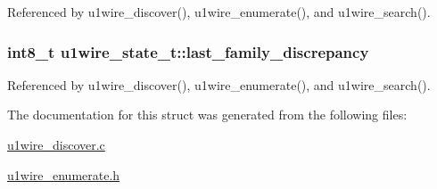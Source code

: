 Referenced by u1wire\_\-discover(), u1wire\_\-enumerate(), and u1wire\_\-search().\hypertarget{structu1wire__state__t_081ea182a1de94cbc5ed7f4045e50ade}{
\subsubsection{\setlength{\rightskip}{0pt plus 5cm}int8\_\-t {\bf u1wire\_\-state\_\-t::last\_\-family\_\-discrepancy}}}
\label{structu1wire__state__t_081ea182a1de94cbc5ed7f4045e50ade}




Referenced by u1wire\_\-discover(), u1wire\_\-enumerate(), and u1wire\_\-search().

The documentation for this struct was generated from the following files:\begin{CompactItemize}
\item 
\hyperlink{u1wire__discover_8c}{u1wire\_\-discover.c}\item 
\hyperlink{u1wire__enumerate_8h}{u1wire\_\-enumerate.h}\end{CompactItemize}
